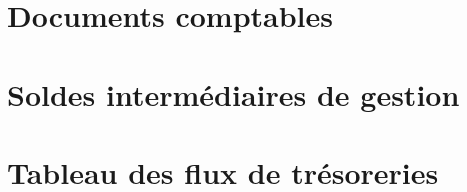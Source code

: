 \documentclass[ebook,9pt,openany,final,french]{memoir}
\begin{document}
\pagestyle{pageStyle}

\frontmatter


\mainmatter
\setglobalstyles






\begin{appendices}

\begingroup

\titlespacing*{\chapter}{0pt}{-15pt}{0pt}

\chapter{Documents comptables}





\chapter{Soldes intermédiaires de gestion}
\label{chapter:sig}


\chapter{Tableau des flux de trésoreries}








\endgroup

\end{appendices}


\backmatter

\end{document}
